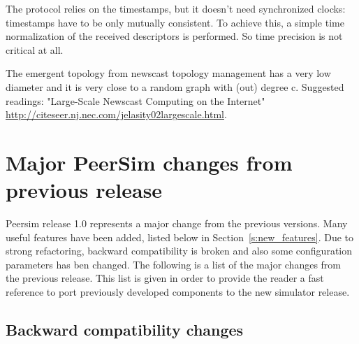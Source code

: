 \documentclass[a4paper,11pt]{article}
\begin{document}
The protocol relies on the timestamps, but it doesn't need synchronized
clocks: timestamps have to be only mutually consistent. To achieve
this, a simple time normalization of the received descriptors is performed.
So time precision is not critical at all. 

The emergent topology from newscast topology management has a very
low diameter and it is very close to a random graph with (out) degree
c. Suggested readings: "Large-Scale Newscast Computing on the Internet" \url{http://citeseer.nj.nec.com/jelasity02largescale.html}.

\section{\label{sec:Appendix-C-changes} Major PeerSim changes from
  previous release}

Peersim release 1.0 represents a major change from the previous
versions. 
Many useful features have been added, listed below in
Section~\ref{s:new_features}.    
Due to strong refactoring, backward compatibility is broken and also
some configuration parameters has ben changed. 
The following is a list of the major changes from the previous
release. This list is given in order to provide the reader a fast reference to
port previously developed components to the new simulator release.

\subsection{Backward compatibility changes}
\label{s:comp_change}
\end{document}
